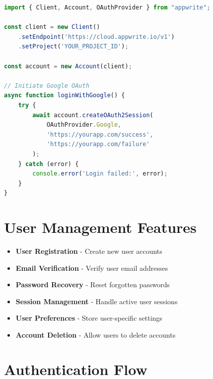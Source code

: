 \documentclass[11pt,a4paper,oneside]{book}
\begin{document}
\begin{lstlisting}[language=JavaScript, caption=Google OAuth Implementation]
import { Client, Account, OAuthProvider } from "appwrite";

const client = new Client()
    .setEndpoint('https://cloud.appwrite.io/v1')
    .setProject('YOUR_PROJECT_ID');

const account = new Account(client);

// Initiate Google OAuth
async function loginWithGoogle() {
    try {
        await account.createOAuth2Session(
            OAuthProvider.Google,
            'https://yourapp.com/success',
            'https://yourapp.com/failure'
        );
    } catch (error) {
        console.error('Login failed:', error);
    }
}
\end{lstlisting}

\section{User Management Features}

\begin{itemize}
    \item \textbf{User Registration} - Create new user accounts
    \item \textbf{Email Verification} - Verify user email addresses
    \item \textbf{Password Recovery} - Reset forgotten passwords
    \item \textbf{Session Management} - Handle active user sessions
    \item \textbf{User Preferences} - Store user-specific settings
    \item \textbf{Account Deletion} - Allow users to delete accounts
\end{itemize}

\section{Authentication Flow}
\end{document}
